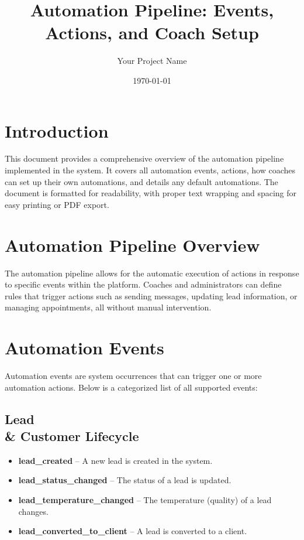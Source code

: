 \documentclass[12pt,a4paper]{article}
\title{Automation Pipeline: Events, Actions, and Coach Setup}
\author{Your Project Name}
\date{\today}
\begin{document}
\maketitle

\section*{Introduction}
This document provides a comprehensive overview of the automation pipeline implemented in the system. It covers all automation events, actions, how coaches can set up their own automations, and details any default automations. The document is formatted for readability, with proper text wrapping and spacing for easy printing or PDF export.

\section{Automation Pipeline Overview}
The automation pipeline allows for the automatic execution of actions in response to specific events within the platform. Coaches and administrators can define rules that trigger actions such as sending messages, updating lead information, or managing appointments, all without manual intervention.

\section{Automation Events}
Automation events are system occurrences that can trigger one or more automation actions. Below is a categorized list of all supported events:

\subsection*{Lead \\& Customer Lifecycle}
\begin{itemize}[leftmargin=2em]
    \item \textbf{lead\_created} -- A new lead is created in the system.
    \item \textbf{lead\_status\_changed} -- The status of a lead is updated.
    \item \textbf{lead\_temperature\_changed} -- The temperature (quality) of a lead changes.
    \item \textbf{lead\_converted\_to\_client} -- A lead is converted to a client.
\end{itemize}
\end{document}
